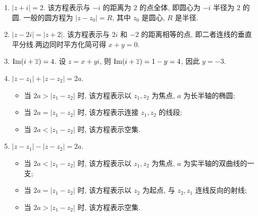 \begin{example}
  \begin{enumerate}
    \item $|z+i|=2$. 该方程表示与 $-i$ 的距离为 $2$ 的点全体, 即圆心为 $-i$ 半径为 $2$ 的圆.
    一般的圆方程为 $|z-z_0|=R$, 其中 $z_0$ 是圆心, $R$ 是半径.
    
\begin{figure}[hbpt]
  \begin{minipage}{.48\textwidth}
    \centering
  \end{minipage}
  \begin{minipage}{.48\textwidth}
    \centering
  \end{minipage}
\end{figure}
    \item $|z-2i|=|z+2|$. 该方程表示与 $2i$ 和 $-2$ 的距离相等的点, 即二者连线的垂直平分线.两边同时平方化简可得 $x+y=0$.
    \item $\operatorname{Im}(i+\overline z)=4$. 设 $z=x+yi$, 则 $\operatorname{Im}(i+\overline z)=1-y=4$, 因此 $y=-3$.
    \item $|z-z_1|+|z-z_2|=2a$.
    \begin{itemize}
      \item 当 $2a>|z_1-z_2|$ 时, 该方程表示以 $z_1,z_2$ 为焦点, $a$ 为长半轴的椭圆;
      \item 当 $2a=|z_1-z_2|$ 时, 该方程表示连接 $z_1,z_2$ 的线段;
      \item 当 $2a<|z_1-z_2|$ 时, 该方程表示空集.
    \end{itemize}
    \item $|z-z_1|-|z-z_2|=2a$.
    \begin{itemize}
      \item 当 $2a<|z_1-z_2|$ 时, 该方程表示以 $z_1,z_2$ 为焦点, $a$ 为实半轴的双曲线的一支;
      \item 当 $2a=|z_1-z_2|$ 时, 该方程表示以 $z_2$ 为起点, 与 $z_2,z_1$ 连线反向的射线;
      \item 当 $2a>|z_1-z_2|$ 时, 该方程表示空集.
    \end{itemize}
  \end{enumerate}
\end{example}

